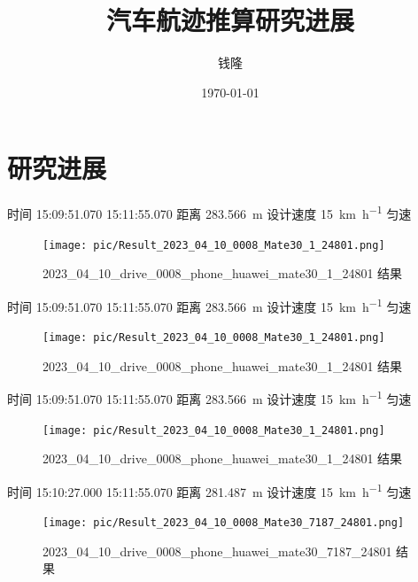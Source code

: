 \documentclass{beamer} %
\title{汽车航迹推算研究进展}
\author{钱隆}
\institute{武汉大学测绘遥感信息工程国家重点实验室}
\date{\today}
\begin{document}
\kaishu

\begin{frame} %
    \titlepage
\end{frame}

\begin{frame}
    \tableofcontents[sectionstyle=show,subsectionstyle=show/shaded/hide,subsubsectionstyle=show/shaded/hide]
\end{frame}


\section{研究进展}

\begin{frame}
    时间 15:09:51.070  15:11:55.070 距离 \qty{283.566}{\meter}
    设计速度 \qty{15}{\km\per\hour} 匀速
    \begin{figure}[htbp]
        \centering
        \texttt{[image: pic/Result\_2023\_04\_10\_0008\_Mate30\_1\_24801.png]}
        \caption{2023\_04\_10\_drive\_0008\_phone\_huawei\_mate30\_1\_24801 结果}
        \label{fig:transformer-arc}
    \end{figure}
\end{frame}

\begin{frame}
    时间 15:09:51.070  15:11:55.070 距离 \qty{283.566}{\meter}
    设计速度 \qty{15}{\km\per\hour} 匀速
    \begin{figure}[htbp]
        \centering
        \texttt{[image: pic/Result\_2023\_04\_10\_0008\_Mate30\_1\_24801.png]}
        \caption{2023\_04\_10\_drive\_0008\_phone\_huawei\_mate30\_1\_24801 结果}
        \label{fig:transformer-arc}
    \end{figure}
\end{frame}

\begin{frame}
    时间 15:09:51.070  15:11:55.070 距离 \qty{283.566}{\meter}
    设计速度 \qty{15}{\km\per\hour} 匀速
    \begin{figure}[htbp]
        \centering
        \texttt{[image: pic/Result\_2023\_04\_10\_0008\_Mate30\_1\_24801.png]}
        \caption{2023\_04\_10\_drive\_0008\_phone\_huawei\_mate30\_1\_24801 结果}
        \label{fig:transformer-arc}
    \end{figure}
\end{frame}

\begin{frame}
    时间 15:10:27.000  15:11:55.070 距离 \qty{281.487}{\meter}
    设计速度 \qty{15}{\km\per\hour} 匀速
    \begin{figure}[htbp]
        \centering
        \texttt{[image: pic/Result\_2023\_04\_10\_0008\_Mate30\_7187\_24801.png]}
        \caption{2023\_04\_10\_drive\_0008\_phone\_huawei\_mate30\_7187\_24801 结果}
        \label{fig:transformer-arc}
    \end{figure}
\end{frame}
\end{document}
